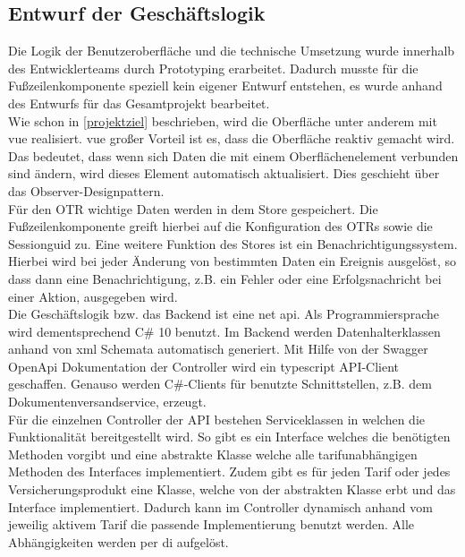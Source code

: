 \subsection{Entwurf der Geschäftslogik}
\label{geschaeftslogik}
Die Logik der Benutzeroberfläche und die technische Umsetzung wurde innerhalb des Entwicklerteams durch Prototyping erarbeitet.
Dadurch musste für die Fußzeilenkomponente speziell kein eigener Entwurf entstehen, es wurde anhand des Entwurfs für das Gesamtprojekt bearbeitet.\\
Wie schon in \ref{projektziel}  beschrieben, wird die Oberfläche unter anderem mit \gls{vue} realisiert. \gls{vue} großer Vorteil ist es, dass die Oberfläche reaktiv gemacht wird. Das bedeutet, dass wenn sich Daten die mit einem Oberflächenelement verbunden sind ändern, wird dieses Element automatisch aktualisiert. Dies geschieht über das Observer-Designpattern.\\
Für den \ac{OTR} wichtige Daten werden in dem Store gespeichert. Die Fußzeilenkomponente greift hierbei auf die Konfiguration des \ac{OTR}s sowie die Sessionguid zu.
Eine weitere Funktion des Stores ist ein Benachrichtigungssystem. Hierbei wird bei jeder Änderung von bestimmten Daten ein Ereignis ausgelöst, so dass dann eine Benachrichtigung, z.B. ein Fehler oder eine Erfolgsnachricht bei einer Aktion, ausgegeben wird.\\

Die Geschäftslogik bzw. das Backend ist eine \gls{net} \gls{api}. Als Programmiersprache wird dementsprechend C\# 10 benutzt.
Im Backend werden Datenhalterklassen anhand von \gls{xml} Schemata automatisch generiert. Mit Hilfe von der Swagger OpenApi Dokumentation der Controller wird ein \gls{typescript} API-Client geschaffen. Genauso werden C\#-Clients für benutzte Schnittstellen, z.B. dem Dokumentenversandservice, erzeugt.\\
Für die einzelnen Controller der API bestehen Serviceklassen in welchen die Funktionalität bereitgestellt wird. So gibt es ein Interface welches die benötigten Methoden vorgibt und eine abstrakte Klasse welche alle tarifunabhängigen Methoden des Interfaces implementiert. Zudem gibt es für jeden Tarif oder jedes Versicherungsprodukt eine Klasse, welche von der abstrakten Klasse erbt und das Interface implementiert. Dadurch kann im Controller dynamisch anhand vom jeweilig aktivem Tarif die passende Implementierung benutzt werden. %
Alle Abhängigkeiten werden per \gls{di} aufgelöst.
